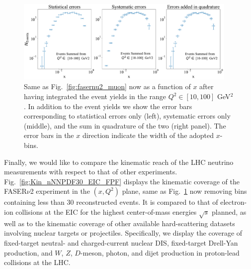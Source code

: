 \begin{figure}[h]
    \centering
    \includegraphics[width = 0.95\textwidth]{plots/error_plot_FASERv2_14.pdf}
    \caption{Same as Fig.~\ref{fig:fasernu2_muon}
      now as a function of $x$ after having integrated the event yields in the range $Q^2 \in [10,100]$ GeV$^2$.
      In addition to the event yields we show the error bars corresponding to
      statistical errors only (left), systematic errors only (middle), and the
      sum in quadrature of the two (right panel).
      The error bars in the $x$ direction indicate the width of the adopted $x$-bins.
      }
    \label{fig:error_plot_FASERv2_14}
\end{figure}

Finally, we would like to compare the kinematic reach
of the LHC neutrino measurements with respect to that of other experiments.
%
Fig.~\ref{fig:Kin_nNNPDF30_EIC_FPF} displays
the kinematic coverage of the FASER$\nu$2 experiment in the $(x,Q^2)$ plane,
same as  Fig.~\ref{fig:error_plot_FASERv2_14} now removing bins
containing less than 30 reconstructed events.
%
It is compared to that of electron-ion collisions
at the EIC for the highest center-of-mass energies $\sqrt{s}$ planned,
as well as to the kinematic coverage of other available hard-scattering datasets involving
nuclear targets or projectiles.
%
Specifically, we display the coverage of fixed-target neutral- and charged-current nuclear DIS,
fixed-target Drell-Yan production, and $W$, $Z$, $D$-meson, photon, and dijet
production in proton-lead collisions at the LHC.

